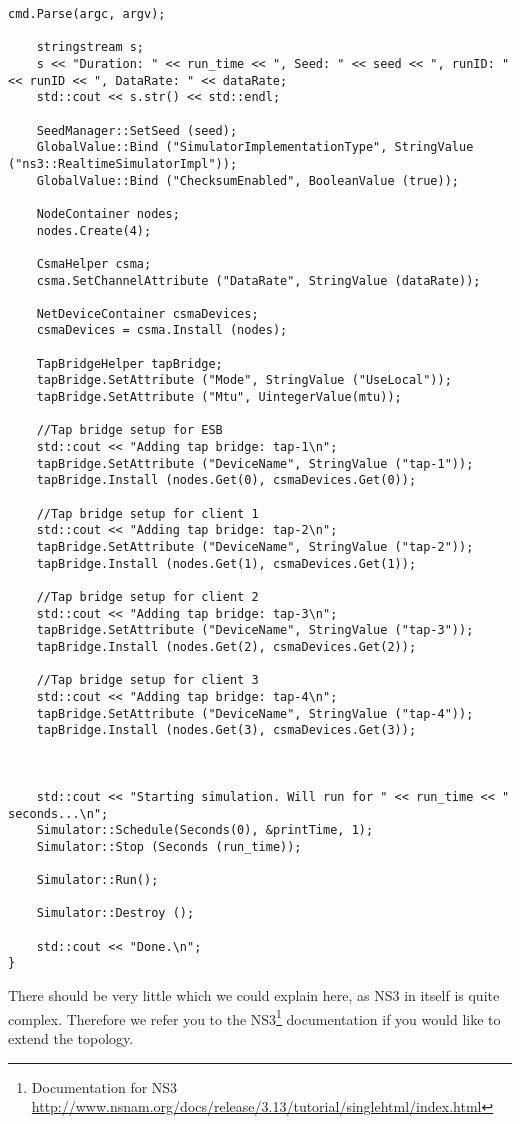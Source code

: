 \begin{lstlisting}[frame=single, caption={System-test-2 Topology}, label=mobiemu:topology, breaklines=true]
    cmd.Parse(argc, argv);
   
    stringstream s;
    s << "Duration: " << run_time << ", Seed: " << seed << ", runID: " << runID << ", DataRate: " << dataRate;
    std::cout << s.str() << std::endl;

    SeedManager::SetSeed (seed);
    GlobalValue::Bind ("SimulatorImplementationType", StringValue ("ns3::RealtimeSimulatorImpl"));
    GlobalValue::Bind ("ChecksumEnabled", BooleanValue (true));
   
    NodeContainer nodes;
    nodes.Create(4);
   
    CsmaHelper csma;
    csma.SetChannelAttribute ("DataRate", StringValue (dataRate));
   
    NetDeviceContainer csmaDevices;
    csmaDevices = csma.Install (nodes);
   
    TapBridgeHelper tapBridge;
    tapBridge.SetAttribute ("Mode", StringValue ("UseLocal"));
    tapBridge.SetAttribute ("Mtu", UintegerValue(mtu));
   
    //Tap bridge setup for ESB
    std::cout << "Adding tap bridge: tap-1\n";
    tapBridge.SetAttribute ("DeviceName", StringValue ("tap-1"));
    tapBridge.Install (nodes.Get(0), csmaDevices.Get(0));
   
    //Tap bridge setup for client 1
    std::cout << "Adding tap bridge: tap-2\n";
    tapBridge.SetAttribute ("DeviceName", StringValue ("tap-2"));
    tapBridge.Install (nodes.Get(1), csmaDevices.Get(1));
   
    //Tap bridge setup for client 2
    std::cout << "Adding tap bridge: tap-3\n";
    tapBridge.SetAttribute ("DeviceName", StringValue ("tap-3"));
    tapBridge.Install (nodes.Get(2), csmaDevices.Get(2));

    //Tap bridge setup for client 3
    std::cout << "Adding tap bridge: tap-4\n";
    tapBridge.SetAttribute ("DeviceName", StringValue ("tap-4"));
    tapBridge.Install (nodes.Get(3), csmaDevices.Get(3));
   
   
   
    std::cout << "Starting simulation. Will run for " << run_time << " seconds...\n";  
    Simulator::Schedule(Seconds(0), &printTime, 1);
    Simulator::Stop (Seconds (run_time));

    Simulator::Run();

    Simulator::Destroy ();

    std::cout << "Done.\n";
}
\end{lstlisting}

There should be very little which we could explain here, as NS3 in itself is quite complex. Therefore we refer you to the NS3\footnote{Documentation for NS3 \url{http://www.nsnam.org/docs/release/3.13/tutorial/singlehtml/index.html}} documentation if you would like to extend the topology.
